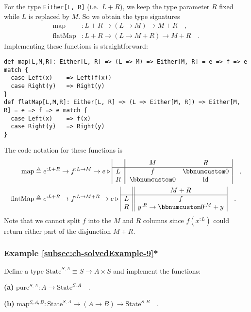 For the type \lstinline!Either[L, R]! (i.e.~$L+R$), we keep the
type parameter $R$ fixed while $L$ is replaced by $M$. So we obtain
the type signatures
\begin{align*}
\text{map} & :L+R\rightarrow(L\rightarrow M)\rightarrow M+R\quad,\\
\text{flatMap} & :L+R\rightarrow(L\rightarrow M+R)\rightarrow M+R\quad.
\end{align*}
Implementing these functions is straightforward:
\begin{lstlisting}
def map[L,M,R]: Either[L, R] => (L => M) => Either[M, R] = e => f => e match {
  case Left(x)    => Left(f(x))
  case Right(y)   => Right(y)
}
def flatMap[L,M,R]: Either[L, R] => (L => Either[M, R]) => Either[M, R] = e => f => e match {
  case Left(x)    => f(x)
  case Right(y)   => Right(y)
}
\end{lstlisting}
The code notation for these functions is
\begin{align*}
\text{map} & \triangleq e^{:L+R}\rightarrow f^{:L\rightarrow M}\rightarrow e\triangleright\begin{array}{|c||cc|}
 & M & R\\
\hline L & f & \bbnum 0\\
R & \bbnum 0 & \text{id}
\end{array}\quad,\\
\text{flatMap} & \triangleq e^{:L+R}\rightarrow f^{:L\rightarrow M+R}\rightarrow e\triangleright\begin{array}{|c||c|}
 & M+R\\
\hline L & f\\
R & y^{:R}\rightarrow\bbnum 0^{:M}+y
\end{array}\quad.
\end{align*}
Note that we cannot split $f$ into the $M$ and $R$ columns since
$f(x^{:L})$ could return either part of the disjunction $M+R$.

\subsubsection{Example \label{subsec:ch-solvedExample-9}\ref{subsec:ch-solvedExample-9}{*}}

Define a type $\text{State}^{S,A}\equiv S\rightarrow A\times S$ and
implement the functions:

\textbf{(a)} $\text{pure}^{S,A}:A\rightarrow\text{State}^{S,A}\quad.$

\textbf{(b)} $\text{map}^{S,A,B}:\text{State}^{S,A}\rightarrow(A\rightarrow B)\rightarrow\text{State}^{S,B}\quad.$

